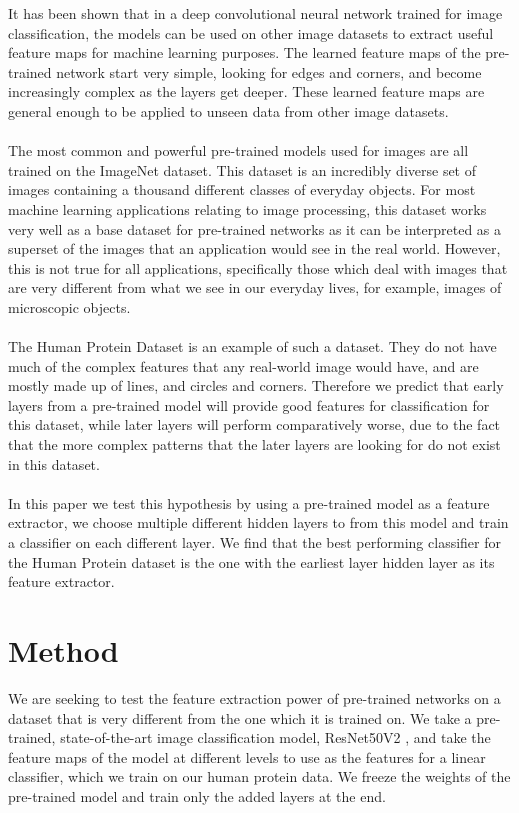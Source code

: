 \documentclass{article}
\begin{document}
It has been shown that in a deep convolutional neural network trained for image classification, the models
can be used on other image datasets to extract useful feature maps for machine learning purposes. The learned feature maps of the pre-trained network start very simple, looking for edges and corners, and become increasingly
complex as the layers get deeper.\cite{10.1007/978-3-319-10590-1_53} These learned feature maps are general enough to be applied to unseen data from other image datasets\cite{NIPS2014_5347}.
\\\\
The most common and powerful pre-trained models used for images are all trained on the ImageNet dataset\cite{imagenet_cvpr09}. This dataset
is an incredibly diverse set of images containing a thousand different classes of everyday objects. For most machine learning
applications relating to image processing, this dataset works very well as a base dataset for pre-trained networks as it can be interpreted as a superset of the images that an application would see in the real world. However, this is not true for all
applications, specifically those which deal with images that are very different from what we see in our everyday lives, for example,
images of microscopic objects.
\\\\
The Human Protein Dataset is an example of such a dataset. They do not have much of the complex features that any real-world image would have, and are mostly made up of lines, and circles and corners. Therefore we predict that early layers from a pre-trained model will
provide good features for classification for this dataset, while later layers will perform comparatively worse, 
due to the fact that the more complex patterns that the later layers are looking for do not exist in this dataset. 
\\\\
In this paper we test this hypothesis by using a pre-trained model as a feature extractor, we choose multiple different
hidden layers to from this model and train a classifier on each different layer. We find that the best performing classifier
for the Human Protein dataset is the one with the earliest layer hidden layer as its feature extractor.

\section{Method}
We are seeking to test the feature extraction power of pre-trained networks on a dataset that is very different from the one which it is trained on. We take 
a pre-trained, state-of-the-art image classification model, ResNet50V2 \cite{DBLP:journals/corr/HeZR016}, and take
the feature maps of the model at different levels to use as the features for 
a linear classifier, which we train on our human protein data. We freeze the weights
of the pre-trained model and train only the added layers at the end.
\end{document}
